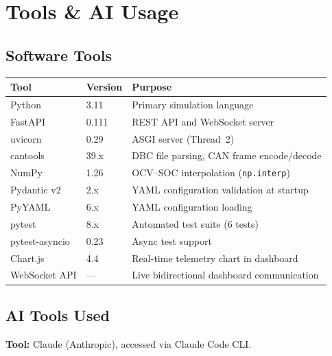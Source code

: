 \documentclass[12pt, a4paper, openany]{report}
\newcommand{\code}[1]{\texttt{#1}}
\begin{document}
\chapter{Tools \& AI Usage}

\section{Software Tools}

\begin{center}
\begin{tabularx}{\textwidth}{llX}
  \toprule
  \rowcolor{TblHead}
  \color{white}\textbf{Tool} &
  \color{white}\textbf{Version} &
  \color{white}\textbf{Purpose} \\
  \midrule
  Python          & 3.11   & Primary simulation language \\
  \rowcolor{TblAlt}
  FastAPI         & 0.111  & REST API and WebSocket server \\
  uvicorn         & 0.29   & ASGI server (Thread~2) \\
  \rowcolor{TblAlt}
  cantools        & 39.x   & DBC file parsing, CAN frame encode/decode \\
  NumPy           & 1.26   & OCV--SOC interpolation (\code{np.interp}) \\
  \rowcolor{TblAlt}
  Pydantic v2     & 2.x    & YAML configuration validation at startup \\
  PyYAML          & 6.x    & YAML configuration loading \\
  \rowcolor{TblAlt}
  pytest          & 8.x    & Automated test suite (6 tests) \\
  pytest-asyncio  & 0.23   & Async test support \\
  \rowcolor{TblAlt}
  Chart.js        & 4.4    & Real-time telemetry chart in dashboard \\
  WebSocket API   & ---    & Live bidirectional dashboard communication \\
  \bottomrule
\end{tabularx}
\end{center}

\section{AI Tools Used}

\textbf{Tool:} Claude (Anthropic), accessed via Claude Code CLI.
\end{document}
